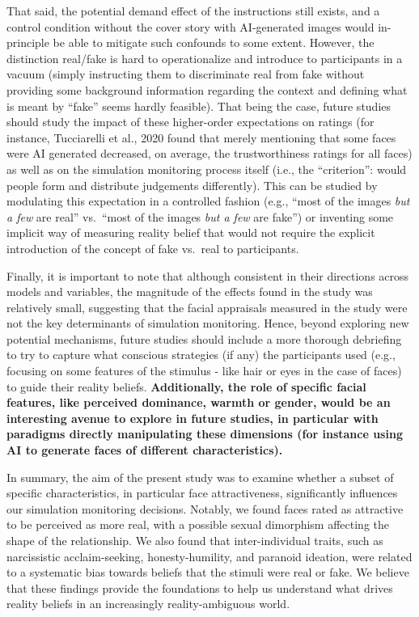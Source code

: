 \documentclass[
  man,
  floatsintext,
  longtable,
  nolmodern,
  notxfonts,
  notimes,
  colorlinks=true,linkcolor=blue,citecolor=blue,urlcolor=blue]{apa7}
\begin{document}
That said, the potential demand effect of the instructions still exists,
and a control condition without the cover story with AI-generated images
would in-principle be able to mitigate such confounds to some extent.
However, the distinction real/fake is hard to operationalize and
introduce to participants in a vacuum (simply instructing them to
discriminate real from fake without providing some background
information regarding the context and defining what is meant by ``fake''
seems hardly feasible). That being the case, future studies should study
the impact of these higher-order expectations on ratings (for instance,
Tucciarelli et al., 2020 found that merely mentioning that some faces
were AI generated decreased, on average, the trustworthiness ratings for
all faces) as well as on the simulation monitoring process itself (i.e.,
the ``criterion'': would people form and distribute judgements
differently). This can be studied by modulating this expectation in a
controlled fashion (e.g., ``most of the images \emph{but a few} are
real'' vs.~``most of the images \emph{but a few} are fake'') or
inventing some implicit way of measuring reality belief that would not
require the explicit introduction of the concept of fake vs.~real to
participants.

Finally, it is important to note that although consistent in their
directions across models and variables, the magnitude of the effects
found in the study was relatively small, suggesting that the facial
appraisals measured in the study were not the key determinants of
simulation monitoring. Hence, beyond exploring new potential mechanisms,
future studies should include a more thorough debriefing to try to
capture what conscious strategies (if any) the participants used (e.g.,
focusing on some features of the stimulus - like hair or eyes in the
case of faces) to guide their reality beliefs. \textbf{Additionally, the
role of specific facial features, like perceived dominance, warmth or
gender, would be an interesting avenue to explore in future studies, in
particular with paradigms directly manipulating these dimensions (for
instance using AI to generate faces of different characteristics).}

In summary, the aim of the present study was to examine whether a subset
of specific characteristics, in particular face attractiveness,
significantly influences our simulation monitoring decisions. Notably,
we found faces rated as attractive to be perceived as more real, with a
possible sexual dimorphism affecting the shape of the relationship. We
also found that inter-individual traits, such as narcissistic
acclaim-seeking, honesty-humility, and paranoid ideation, were related
to a systematic bias towards beliefs that the stimuli were real or fake.
We believe that these findings provide the foundations to help us
understand what drives reality beliefs in an increasingly
reality-ambiguous world.
\end{document}
